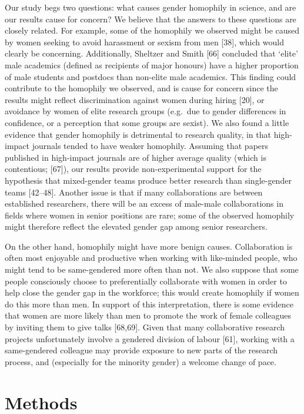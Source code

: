 \documentclass[12pt,]{article}
\begin{document}
Our study begs two questions: what causes gender homophily in science,
and are our results cause for concern? We believe that the answers to
these questions are closely related. For example, some of the homophily
we observed might be caused by women seeking to avoid harassment or
sexism from men {[}38{]}, which would clearly be concerning.
Additionally, Sheltzer and Smith {[}66{]} concluded that `elite' male
academics (defined as recipients of major honours) have a higher
proportion of male students and postdocs than non-elite male academics.
This finding could contribute to the homophily we observed, and is cause
for concern since the results might reflect discrimination against women
during hiring {[}20{]}, or avoidance by women of elite research groups
(e.g.~due to gender differences in confidence, or a perception that some
groups are sexist). We also found a little evidence that gender
homophily is detrimental to research quality, in that high-impact
journals tended to have weaker homophily. Assuming that papers published
in high-impact journals are of higher average quality (which is
contentious; {[}67{]}), our results provide non-experimental support for
the hypothesis that mixed-gender teams produce better research than
single-gender teams {[}42--48{]}. Another issue is that if many
collaborations are between established researchers, there will be an
excess of male-male collaborations in fields where women in senior
positions are rare; some of the observed homophily might therefore
reflect the elevated gender gap among senior researchers.

On the other hand, homophily might have more benign causes.
Collaboration is often most enjoyable and productive when working with
like-minded people, who might tend to be same-gendered more often than
not. We also suppose that some people consciously choose to
preferentially collaborate with women in order to help close the gender
gap in the workforce; this would create homophily if women do this more
than men. In support of this interpretation, there is some evidence that
women are more likely than men to promote the work of female colleagues
by inviting them to give talks {[}68,69{]}. Given that many
collaborative research projects unfortunately involve a gendered
division of labour {[}61{]}, working with a same-gendered colleague may
provide exposure to new parts of the research process, and (especially
for the minority gender) a welcome change of pace.

\section{Methods}\label{methods}
\end{document}
